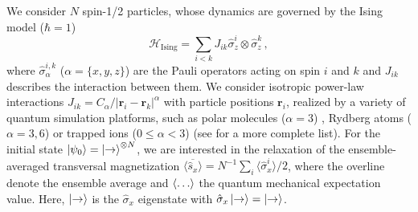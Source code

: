 \documentclass[aps,twocolumn,
superscriptaddress,
footinbib,
prl]{revtex4-1}
\begin{document}
We consider $N$ spin-1/2 particles, whose dynamics are governed by the Ising model ($\hbar=1$)
\begin{equation}
    \mathcal{H}_{\mathrm{Ising}} =  \sum_{i < k}J_{ik} \hat{\sigma}_z^i \otimes \hat{\sigma}_z^k  \,,
\end{equation}
where $\hat{\sigma}_\alpha^{i,k}$ ($\alpha = \{x,y,z\}$) are the Pauli operators acting on spin $i$ and $k$ and $J_{ik}$ describes the interaction between them. We consider isotropic power-law interactions $J_{ik} = C_\alpha/|\mathbf{r}_i - \mathbf{r}_k|^\alpha$ with particle positions $\mathbf{r}_i$, realized by a variety of quantum simulation platforms, such as polar molecules ($\alpha = 3$) \cite{Yan2013, Hazzard2014Many-bodyLattice}, Rydberg atoms  ($\alpha=3,6$) \cite{Orioli2018, Signoles2021GlassySystem, Scholl2020, Ebadi2020}  or trapped ions ($0\leq \alpha < 3$) \cite{Britton2012EngineeredSpins, Monroe2019} (see \cite{Hazzard2014QuantumSystems} for a more complete list).
For the initial state  $\ket{\psi_0} = \ket{\rightarrow} ^{\otimes N}$, we are interested in the relaxation of the ensemble-averaged transversal magnetization $\overline{\langle \hat{s}_x \rangle} = N^{-1} \sum_i \langle \hat{\sigma}_x^i \rangle/2$, where the overline denote the ensemble average and $\Braket{\dots}$ the quantum mechanical expectation value. Here, $\ket{\rightarrow}$ is the $\hat{\sigma}_x$ eigenstate with $\hat{\sigma}_x \ket{\rightarrow} = \ket{\rightarrow} $.
\end{document}
